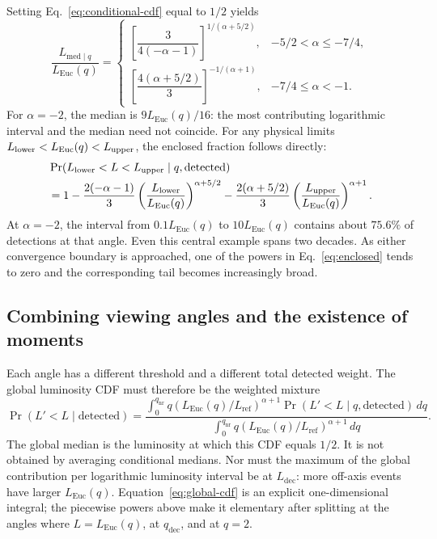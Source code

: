 \documentclass[11pt,a4paper]{article}
\newcommand{\Euc}{\mathrm{Euc}}
\newcommand{\dec}{\mathrm{dec}}
\newcommand{\nr}{\mathrm{nr}}
\newcommand{\Lref}{L_{\mathrm{ref}}}
\newcommand{\Ldec}{L_{\mathrm{dec}}}
\begin{document}
Setting Eq.~\eqref{eq:conditional-cdf} equal to $1/2$ yields
\begin{equation}
 \frac{L_{\mathrm{med}\mid q}}{L_\Euc(q)}=
 \begin{cases}
 \left[\dfrac{3}{4(-\alpha-1)}\right]^{1/(\alpha+5/2)},
     &-5/2<\alpha\le-7/4,\\[7pt]
 \left[\dfrac{4(\alpha+5/2)}3\right]^{-1/(\alpha+1)},
     &-7/4\le\alpha<-1.
 \end{cases}
 \label{eq:Lmedian}
\end{equation}
For $\alpha=-2$, the median is $9L_\Euc(q)/16$: the most contributing
logarithmic interval and the median need not coincide.
For any physical limits $L_{\rm lower}<L_\Euc(q)<L_{\rm upper}$,
the enclosed fraction follows directly:
\begin{align}
 &\Pr(L_{\rm lower}<L<L_{\rm upper}\mid q,\mathrm{detected})\notag\\
 &=1-\frac{2(-\alpha-1)}3
 \left(\frac{L_{\rm lower}}{L_\Euc(q)}\right)^{\alpha+5/2}
 -\frac{2(\alpha+5/2)}3
 \left(\frac{L_{\rm upper}}{L_\Euc(q)}\right)^{\alpha+1}.
 \label{eq:enclosed}
\end{align}
At $\alpha=-2$, the interval from $0.1L_\Euc(q)$ to $10L_\Euc(q)$ contains
about $75.6\%$ of detections at that angle. Even this central example spans
two decades. As either convergence boundary is approached, one of the
powers in Eq.~\eqref{eq:enclosed} tends to zero and the corresponding tail
becomes increasingly broad.

\subsection{Combining viewing angles and the existence of moments}
Each angle has a different threshold and a different total detected weight.
The global luminosity CDF must therefore be the weighted mixture
\begin{equation}
 \Pr(L'<L\mid\mathrm{detected})=
 \frac{\displaystyle\int_0^{q_\nr}q
 (L_\Euc(q)/\Lref)^{\alpha+1}
 \Pr(L'<L\mid q,\mathrm{detected})\,dq}
 {\displaystyle\int_0^{q_\nr}q
 (L_\Euc(q)/\Lref)^{\alpha+1}\,dq}.
 \label{eq:global-cdf}
\end{equation}
The global median is the luminosity at which this CDF equals $1/2$.
It is not obtained by averaging conditional medians. Nor must the maximum of the global contribution per logarithmic luminosity
interval be at $\Ldec$: more off-axis events have larger $L_\Euc(q)$.
Equation~\eqref{eq:global-cdf} is an explicit one-dimensional integral;
the piecewise powers above make it elementary after splitting at the angles
where $L=L_\Euc(q)$, at $q_\dec$, and at $q=2$.
\end{document}
